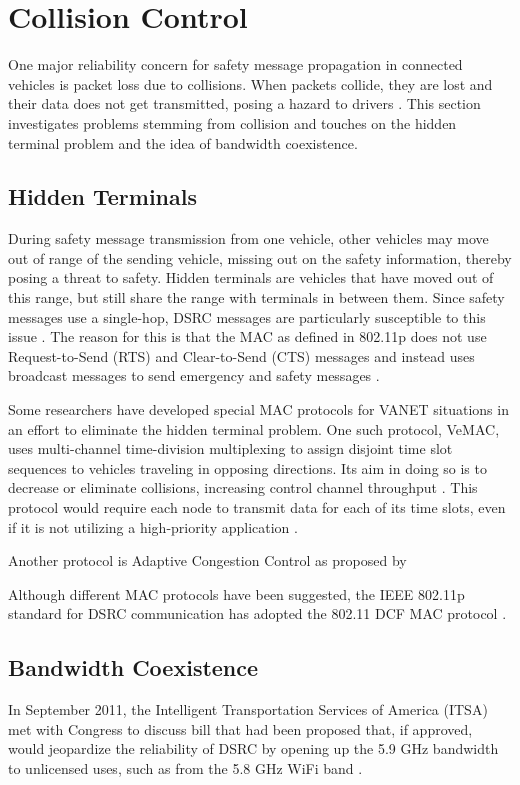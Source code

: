 \documentclass[twoside,conference]{IEEEtran}
\begin{document}
\section{Collision Control}\label{sec:collision}
	One major reliability concern for safety message propagation in connected vehicles is packet loss due to collisions. When packets collide, they are lost and their data does not get transmitted, posing a hazard to drivers \cite{Hassan2011}. This section investigates problems stemming from collision and touches on the hidden terminal problem and the idea of bandwidth coexistence. 

	\subsection{Hidden Terminals}\label{sec:hiddenterminal}
		During safety message transmission from one vehicle, other vehicles may move out of range of the sending vehicle, missing out on the safety information, thereby posing a threat to safety. Hidden terminals are vehicles that have moved out of this range, but still share the range with terminals in between them. Since safety messages use a single-hop, DSRC messages are particularly susceptible to this issue \cite{Ma2009}.  The reason for this is that the MAC as defined in 802.11p does not use Request-to-Send (RTS) and Clear-to-Send (CTS) messages and instead uses broadcast messages to send emergency and safety messages \cite[p. 969]{Rahman2014}. 
		
		Some researchers have developed special MAC protocols for VANET situations in an effort to eliminate the hidden terminal problem. One such protocol, VeMAC, uses multi-channel time-division multiplexing to assign disjoint time slot sequences to vehicles traveling in opposing directions. Its aim in doing so is to decrease or eliminate collisions, increasing control channel throughput \cite{Omar2013}. This protocol would require each node to transmit data for each of its time slots, even if it is not utilizing a high-priority application \cite{Kolte2014}. 
		
		Another protocol is Adaptive Congestion Control as proposed by \cite[p. 3]{Kolte2014}
		
		Although different MAC protocols have been suggested, the IEEE 802.11p standard for DSRC communication has adopted the 802.11 DCF MAC protocol \cite{Hassan2011}. 
		
	\subsection{Bandwidth Coexistence}\label{sec:coexistence}
		In September 2011, the Intelligent Transportation Services of America (ITSA) met with Congress to discuss bill that had been proposed that, if approved, would jeopardize the reliability of DSRC by opening up the 5.9 GHz bandwidth to unlicensed uses, such as from the 5.8 GHz WiFi band \cite{ITSA2011,Lansford2013}.
	
\end{document}
